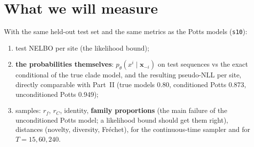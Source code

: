 \section{What we will measure}\label{sec:md_plan}
With the same held-out test set and the same metrics as the Potts models (\texttt{s10}):
\begin{enumerate}[nosep]
\item test NELBO per site (the likelihood bound);
\item \textbf{the probabilities themselves}: $p_\theta(x^i\mid\bm x_{-i})$ on test sequences vs the exact conditional of the true clade
      model, and the resulting pseudo-NLL per site, directly comparable with Part~II (true models 0.80, conditioned Potts
      0.873, unconditioned Potts 0.949);
\item samples: $r_f$, $r_C$, identity, \textbf{family proportions} (the main failure of the unconditioned Potts model; a likelihood
      bound should get them right), distances (novelty, diversity, Fréchet), for the continuous-time sampler and for $T=15,60,240$.
\end{enumerate}
